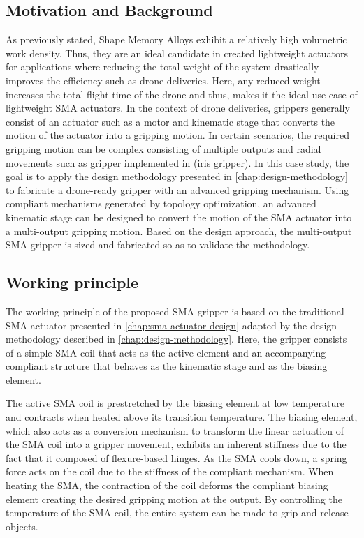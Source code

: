 \subsection{Motivation and Background}
As previously stated, Shape Memory Alloys exhibit a relatively high volumetric work density. Thus, they are an ideal candidate in created lightweight actuators for applications where reducing the total weight of the system drastically improves the efficiency such as drone deliveries. Here, any reduced weight increases the total flight time of the drone and thus, makes it the ideal use case of lightweight SMA actuators.
In the context of drone deliveries, grippers generally consist of an actuator such as a motor and kinematic stage that converts the motion of the actuator into a gripping motion. In certain scenarios, the required gripping motion can be complex consisting of multiple outputs and radial movements such as gripper implemented in \todocite (iris gripper).
In this case study, the goal is to apply the design methodology presented in \cref{chap:design-methodology} to fabricate a drone-ready gripper with an advanced gripping mechanism. Using compliant mechanisms generated by topology optimization, an advanced kinematic stage can be designed to convert the motion of the SMA actuator into a multi-output gripping motion. Based on the design approach, the multi-output SMA gripper is sized and fabricated so as to validate the methodology.
\subsection{Working principle}
The working principle of the proposed SMA gripper is based on the traditional SMA actuator presented in \cref{chap:sma-actuator-design} adapted by the design methodology described in \cref{chap:design-methodology}. Here, the gripper consists of a simple SMA coil that acts as the active element and an accompanying compliant structure that behaves as the kinematic stage and as the biasing element.

The active SMA coil is prestretched by the biasing element at low temperature and contracts when heated above its transition temperature. The biasing element, which also acts as a conversion mechanism to transform the linear actuation of the SMA coil into a gripper movement, exhibits an inherent stiffness due to the fact that it composed of flexure-based hinges. As the SMA cools down, a spring force acts on the coil due to the stiffness of the compliant mechanism. When heating the SMA, the contraction of the coil deforms the compliant biasing element creating the desired gripping motion at the output. By controlling the temperature of the SMA coil, the entire system can be made to grip and release objects.

